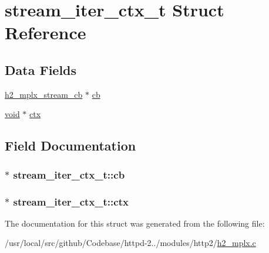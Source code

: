 \hypertarget{structstream__iter__ctx__t}{}\section{stream\+\_\+iter\+\_\+ctx\+\_\+t Struct Reference}
\label{structstream__iter__ctx__t}
\subsection*{Data Fields}
\begin{DoxyCompactItemize}
\item 
\hyperlink{h2__mplx_8h_a0c76c78abf689f5aa1982515e4972c82}{h2\+\_\+mplx\+\_\+stream\+\_\+cb} $\ast$ \hyperlink{structstream__iter__ctx__t_a9f0181dbf78d5fd135ea7aad23d68b28}{cb}
\item 
\hyperlink{group__MOD__ISAPI_gacd6cdbf73df3d9eed42fa493d9b621a6}{void} $\ast$ \hyperlink{structstream__iter__ctx__t_a61ab967d8e105632d81c6931b11a29cc}{ctx}
\end{DoxyCompactItemize}


\subsection{Field Documentation}
\subsubsection[{\texorpdfstring{cb}{cb}}]{$\ast$ stream\+\_\+iter\+\_\+ctx\+\_\+t\+::cb}\hypertarget{structstream__iter__ctx__t_a9f0181dbf78d5fd135ea7aad23d68b28}{}\label{structstream__iter__ctx__t_a9f0181dbf78d5fd135ea7aad23d68b28}
\subsubsection[{\texorpdfstring{ctx}{ctx}}]{$\ast$ stream\+\_\+iter\+\_\+ctx\+\_\+t\+::ctx}\hypertarget{structstream__iter__ctx__t_a61ab967d8e105632d81c6931b11a29cc}{}\label{structstream__iter__ctx__t_a61ab967d8e105632d81c6931b11a29cc}


The documentation for this struct was generated from the following file\+:\begin{DoxyCompactItemize}
\item 
/usr/local/src/github/\+Codebase/httpd-\/2../modules/http2/\hyperlink{h2__mplx_8c}{h2\+\_\+mplx.\+c}\end{DoxyCompactItemize}
